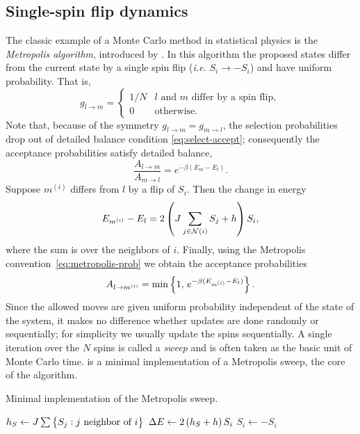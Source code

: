 \subsection{Single-spin flip dynamics}

The classic example of a Monte Carlo method in statistical physics is the
\emph{Metropolis algorithm}, introduced by \textcite{metropolis1953equation}.
In this algorithm the proposed states differ from the current state by a single
spin flip (\emph{i.e.} $S_i \to -S_i$) and have uniform probability. That is,
\begin{equation}
  g_{l \to m} =
  \begin{cases}
    1/N & \text{$l$ and $m$ differ by a spin flip}, \\
    0   & \text{otherwise}.
  \end{cases}
\end{equation}
Note that, because of the symmetry $g_{l \to m} = g_{m \to l}$, the selection
probabilities drop out of detailed balance condition \eqref{eq:select-accept};
consequently the acceptance probabilities satisfy detailed balance,
\begin{equation}
  \frac{A_{l \to m}}{A_{m \to l}} = e^{-\beta(E_m - E_l)}.
\end{equation}
Suppose $m^{(i)}$ differs from $l$ by a flip of $S_i$. Then the change in energy
\begin{equation}
  E_{m^{(i)}} - E_l = 2 \left(J \sum_{j \in \mathcal{N}(i)} S_j + h\right) S_i,
\end{equation}
where the sum is over the neighbors of $i$. Finally, using the Metropolis
convention~\eqref{eq:metropolis-prob} we obtain the acceptance probabilities
\begin{equation}
  A_{l \to m^{(i)}} = \min\cbr{1,\,e^{-\beta(E_{m^{(i)}}-E_l)}}.
\end{equation}
Since the allowed moves are given uniform probability independent of the state
of the system, it makes no difference whether updates are done randomly or
sequentially; for simplicity we usually update the spins sequentially. A single
iteration over the $N$ spins is called a \emph{sweep} and is often taken as the
basic unit of Monte Carlo time.  is a minimal
implementation of a Metropolis sweep, the core of the algorithm.

\begin{algorithm}
\caption{Minimal implementation of the Metropolis sweep.}
\label{alg:metropolis}
\begin{algorithmic}
    \State $h_S \gets J \sum\cbr{S_j: \text{$j$ neighbor of $i$}}$
    \State $\Delta E \gets 2\left(h_S  + h\right) S_i$
      \State $S_i \gets -S_i$
    \EndIf
  \EndFor
\EndProcedure
\end{algorithmic}
\end{algorithm}


